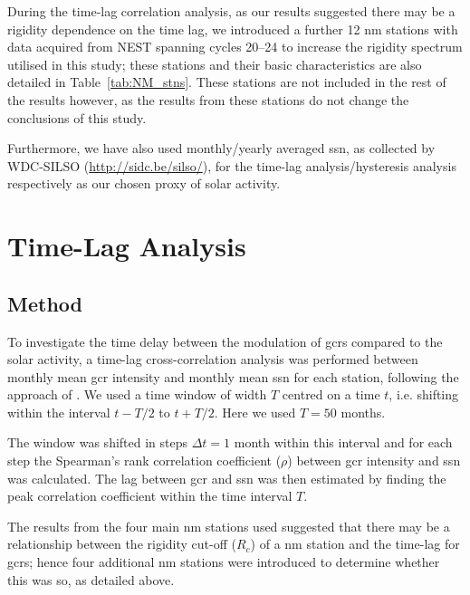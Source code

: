 During the time-lag correlation analysis, as our results suggested there may be a rigidity dependence on the time lag, we introduced a further 12 \gls{nm} stations with data acquired from NEST spanning cycles 20--24 to increase the rigidity spectrum utilised in this study; these stations and their basic characteristics are also detailed in Table~\ref{tab:NM_stns}. These stations are not included in the rest of the results however, as the results from these stations do not change the conclusions of this study.

Furthermore, we have also used monthly/yearly averaged \gls{ssn}, as collected by WDC-SILSO (\url{http://sidc.be/silso/}), for the time-lag analysis/hysteresis analysis respectively as our chosen proxy of solar activity.


\section{Time-Lag Analysis}
\label{sec:lag}

\subsection{Method}
\label{TL-Method} 
To investigate the time delay between the modulation of \glspl{gcr} compared to the solar activity, a time-lag cross-correlation analysis was performed between monthly mean \gls{gcr} intensity and monthly mean \gls{ssn} for each station, following the approach of \citet{usoskin_correlative_1998}. We used a time window of width $T$ centred on a time $t$, i.e. shifting within the interval $t-T/2$ to $t+T/2$. Here we used $T = 50$ months.

The window was shifted in steps $\Delta t = 1$ month within this interval and for each step the Spearman's rank correlation coefficient ($\rho$) between \gls{gcr} intensity and \gls{ssn} was calculated. The lag between \gls{gcr} and \gls{ssn} was then estimated by finding the peak correlation coefficient within the time interval $T$.

The results from the four main \gls{nm} stations used suggested that there may be a relationship between the rigidity cut-off ($R_c$) of a \gls{nm} station and the time-lag for \glspl{gcr}; hence four additional \gls{nm} stations were introduced to determine whether this was so, as detailed above.



